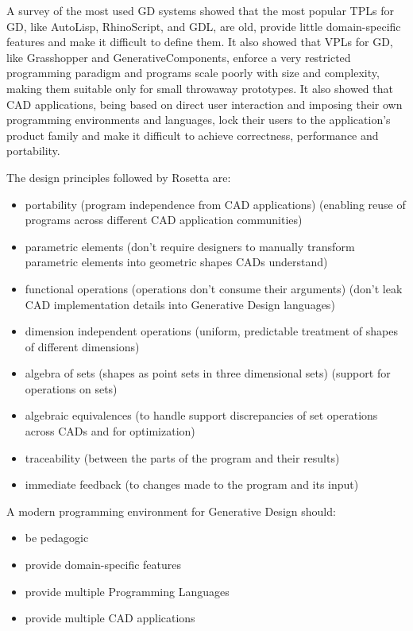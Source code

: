 \documentclass{./llncs2e/llncs}
\begin{document}
	A survey of the most used GD systems showed that the most popular TPLs for GD, like AutoLisp, RhinoScript, and GDL, are old, provide little domain-specific features and make it difficult to define them.
	It also showed that VPLs for GD, like Grasshopper and GenerativeComponents, enforce a very restricted programming paradigm and programs scale poorly with size and complexity, making them suitable only for small throwaway prototypes. 
	It also showed that CAD applications, being based on direct user interaction and imposing their own programming environments and languages, lock their users to the application's product family and make it difficult to achieve correctness, performance and portability.

	The design principles followed by Rosetta are:
	\begin{itemize}
		\item portability (program independence from CAD applications) (enabling reuse of programs across different CAD application communities)
		\item parametric elements (don't require designers to manually transform parametric elements into geometric shapes CADs understand)
		\item functional operations (operations don't consume their arguments) (don't leak CAD implementation details into Generative Design languages)
		\item dimension independent operations (uniform, predictable treatment of shapes of different dimensions)
		\item algebra of sets (shapes as point sets in three dimensional sets) (support for operations on sets)
		\item algebraic equivalences (to handle support discrepancies of set operations across CADs and for optimization)
		\item traceability (between the parts of the program and their results)
		\item immediate feedback (to changes made to the program and its input)
	\end{itemize}

	A modern programming environment for Generative Design should:
	\begin{itemize}
		\item be pedagogic
		\item provide domain-specific features
		\item provide multiple Programming Languages
		\item provide multiple CAD applications
	\end{itemize}
\end{document}
